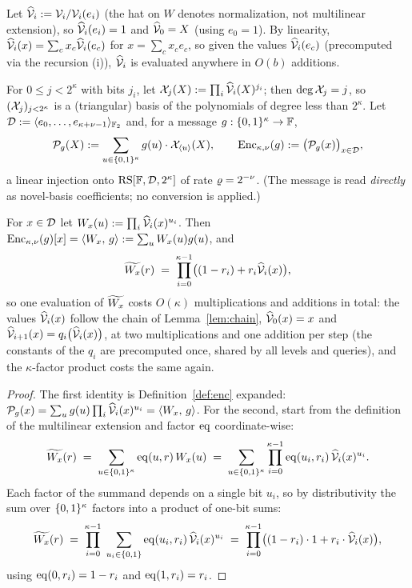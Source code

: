 Let $\widehat{\mathcal{V}}_{i} := \mathcal{V}_i / \mathcal{V}_i(e_i)$ (the hat on $W$ denotes normalization, not multilinear extension), so $\widehat{\mathcal{V}}_{i}(e_i) = 1$ and $\widehat{\mathcal{V}}_{0} = X$ (using $e_0 = 1$). By linearity, $\widehat{\mathcal{V}}_{i}(x) = \sum_c x_c \widehat{\mathcal{V}}_{i}(e_c)$ for $x = \sum_c x_c e_c$, so given the values $\widehat{\mathcal{V}}_{i}(e_c)$ (precomputed via the recursion (i)), $\widehat{\mathcal{V}}_{i}$ is evaluated anywhere in $O(b)$ additions.

\begin{definition}\label{def:enc}
For $0 \le j < 2^{\kappa}$ with bits $j_i$, let $\mathcal{X}_j(X) := \prod_i \widehat{\mathcal{V}}_{i}(X)^{j_i}$; then $\deg \mathcal{X}_j = j$, so $(\mathcal{X}_j)_{j < 2^\kappa}$ is a (triangular) basis of the polynomials of degree less than $2^{\kappa}$. Let $\mathcal{D} := \langle e_0, \dots, e_{\kappa+\nu-1} \rangle_{\mathbb{F}_2}$ and, for a message $g : \{0,1\}^{\kappa} \to \mathbb{F}$,
\[
\mathcal{P}_g(X) := \sum_{u \in \{0,1\}^{\kappa}} g(u) \cdot \mathcal{X}_{\langle u \rangle}(X), \qquad \mathrm{Enc}_{\kappa,\nu}(g) := \bigl(\mathcal{P}_g(x)\bigr)_{x \in \mathcal{D}},
\]
a linear injection onto $\mathrm{RS}[\mathbb{F}, \mathcal{D}, 2^{\kappa}]$ of rate $\varrho = 2^{-\nu}$. (The message is read \emph{directly} as novel-basis coefficients; no conversion is applied.)
\end{definition}

\begin{lemma}\label{lem:colweight}
For $x \in \mathcal{D}$ let $W_x(u) := \prod_i \widehat{\mathcal{V}}_{i}(x)^{u_i}$. Then $\mathrm{Enc}_{\kappa,\nu}(g)[x] = \langle W_x,\, g \rangle := \sum_u W_x(u) g(u)$, and
\[
\widetilde{W_x}(r) \;=\; \prod_{i=0}^{\kappa-1} \bigl( (1-r_i) + r_i \widehat{\mathcal{V}}_{i}(x) \bigr),
\]
so one evaluation of $\widetilde{W_x}$ costs $O(\kappa)$ multiplications and additions in total: the values $\widehat{\mathcal{V}}_{i}(x)$ follow the chain of Lemma~\ref{lem:chain}, $\widehat{\mathcal{V}}_{0}(x) = x$ and $\widehat{\mathcal{V}}_{i+1}(x) = q_i\bigl(\widehat{\mathcal{V}}_{i}(x)\bigr)$, at two multiplications and one addition per step (the constants of the $q_i$ are precomputed once, shared by all levels and queries), and the $\kappa$-factor product costs the same again.
\end{lemma}

\begin{proof}
The first identity is Definition~\ref{def:enc} expanded: $\mathcal{P}_g(x) = \sum_u g(u) \prod_i \widehat{\mathcal{V}}_{i}(x)^{u_i} = \langle W_x,\, g \rangle$. For the second, start from the definition of the multilinear extension and factor $\operatorname{eq}$ coordinate-wise:
\[
\widetilde{W_x}(r) \;=\; \sum_{u \in \{0,1\}^{\kappa}} \operatorname{eq}(u, r)\, W_x(u) \;=\; \sum_{u \in \{0,1\}^{\kappa}} \prod_{i=0}^{\kappa-1} \operatorname{eq}(u_i, r_i)\, \widehat{\mathcal{V}}_{i}(x)^{u_i} .
\]
Each factor of the summand depends on a single bit $u_i$, so by distributivity the sum over $\{0,1\}^{\kappa}$ factors into a product of one-bit sums:
\[
\widetilde{W_x}(r) \;=\; \prod_{i=0}^{\kappa-1} \; \sum_{u_i \in \{0,1\}} \operatorname{eq}(u_i, r_i)\, \widehat{\mathcal{V}}_{i}(x)^{u_i} \;=\; \prod_{i=0}^{\kappa-1} \bigl( (1-r_i) \cdot 1 + r_i \cdot \widehat{\mathcal{V}}_{i}(x) \bigr),
\]
using $\operatorname{eq}(0, r_i) = 1 - r_i$ and $\operatorname{eq}(1, r_i) = r_i$.
\end{proof}

